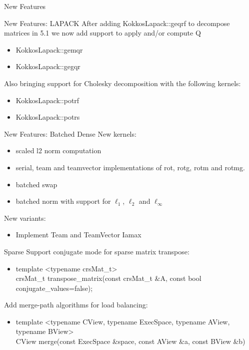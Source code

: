 \begin{frame}[fragile]

  {\Huge New Features}

  \vspace{10pt}

\end{frame}

\begin{frame}[fragile]{New Features: LAPACK}
  After adding {\ttfamily KokkosLapack::geqrf} to decompose matrices in 5.1 we now add support to apply and/or compute Q
  \begin{itemize}
  \item {\ttfamily KokkosLapack::gemqr}
  \item {\ttfamily KokkosLapack::gegqr}
  \end{itemize}
  Also bringing support for Cholesky decomposition with the following kernels:
  \begin{itemize}
  \item {\ttfamily KokkosLapack::potrf}
  \item {\ttfamily KokkosLapack::potrs}
  \end{itemize}
\end{frame}

\begin{frame}[fragile]{New Features: Batched Dense}
  New kernels:
  \begin{itemize}
  \item scaled l2 norm computation
  \item serial, team and teamvector implementations of rot, rotg, rotm and rotmg.
  \item batched swap
  \item batched norm with support for $\ell_1$, $\ell_2$ and $\ell_\infty$
  \end{itemize}
  New variants:
  \begin{itemize}
  \item Implement Team and TeamVector Iamax
  \end{itemize}
\end{frame}

\begin{frame}[fragile]{Sparse}
  Support conjugate mode for sparse matrix transpose:
  \begin{itemize}
  \item {\footnotesize\ttfamily template <typename crsMat\_t>\\ crsMat\_t transpose\_matrix(const crsMat\_t \&A, const bool conjugate\_values=false);}
  \end{itemize}
  Add merge-path algorithms for load balancing:
  \begin{itemize}
  \item {\footnotesize\ttfamily template <typename CView, typename ExecSpace, typename AView, typename BView>\\ CView merge(const ExecSpace \&space, const AView \&a, const BView \&b)}
  \end{itemize}
\end{frame}

